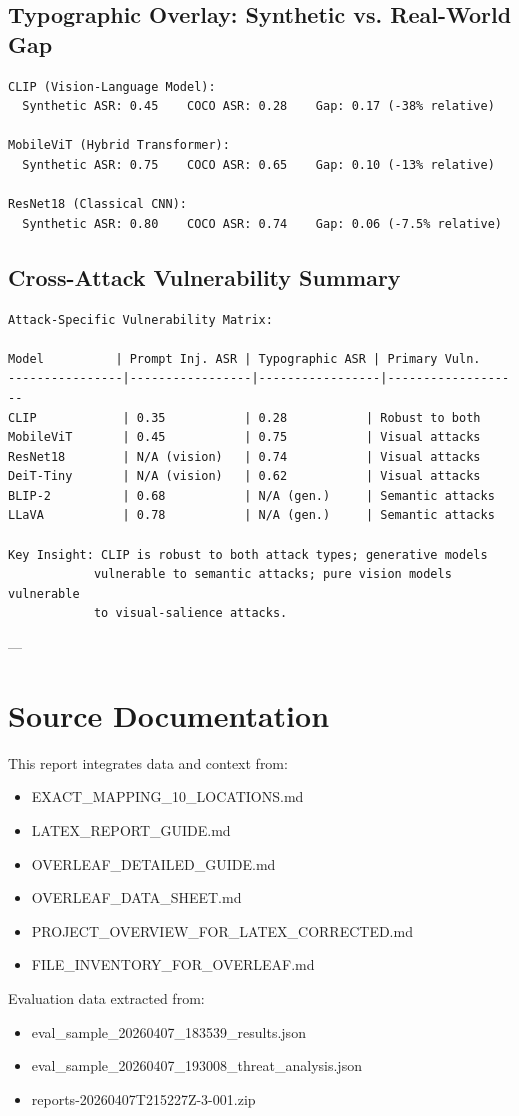 \documentclass[11pt]{article}
\begin{document}
\subsection{Typographic Overlay: Synthetic vs. Real-World Gap}

\begin{verbatim}
CLIP (Vision-Language Model):
  Synthetic ASR: 0.45    COCO ASR: 0.28    Gap: 0.17 (-38% relative)

MobileViT (Hybrid Transformer):
  Synthetic ASR: 0.75    COCO ASR: 0.65    Gap: 0.10 (-13% relative)

ResNet18 (Classical CNN):
  Synthetic ASR: 0.80    COCO ASR: 0.74    Gap: 0.06 (-7.5% relative)
\end{verbatim}

\subsection{Cross-Attack Vulnerability Summary}

\begin{verbatim}
Attack-Specific Vulnerability Matrix:

Model          | Prompt Inj. ASR | Typographic ASR | Primary Vuln.
----------------|-----------------|-----------------|-------------------
CLIP            | 0.35           | 0.28           | Robust to both
MobileViT       | 0.45           | 0.75           | Visual attacks
ResNet18        | N/A (vision)   | 0.74           | Visual attacks
DeiT-Tiny       | N/A (vision)   | 0.62           | Visual attacks
BLIP-2          | 0.68           | N/A (gen.)     | Semantic attacks
LLaVA           | 0.78           | N/A (gen.)     | Semantic attacks

Key Insight: CLIP is robust to both attack types; generative models
            vulnerable to semantic attacks; pure vision models vulnerable
            to visual-salience attacks.
\end{verbatim}

---

\section{Source Documentation}

This report integrates data and context from:

\begin{itemize}[leftmargin=2em]
    \item EXACT\_MAPPING\_10\_LOCATIONS.md
    \item LATEX\_REPORT\_GUIDE.md
    \item OVERLEAF\_DETAILED\_GUIDE.md
    \item OVERLEAF\_DATA\_SHEET.md
    \item PROJECT\_OVERVIEW\_FOR\_LATEX\_CORRECTED.md
    \item FILE\_INVENTORY\_FOR\_OVERLEAF.md
\end{itemize}

Evaluation data extracted from:
\begin{itemize}[leftmargin=2em]
    \item eval\_sample\_20260407\_183539\_results.json
    \item eval\_sample\_20260407\_193008\_threat\_analysis.json
    \item reports-20260407T215227Z-3-001.zip
\end{itemize}
\end{document}

